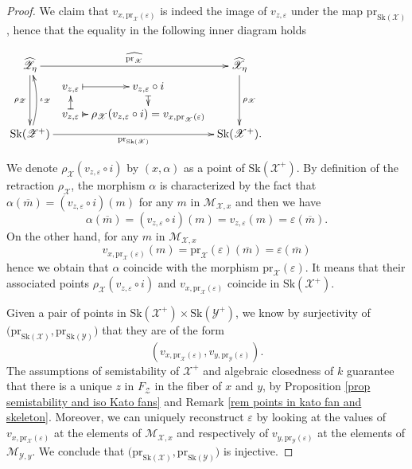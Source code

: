\documentclass{amsart}%
\numberwithin{equation}{subsection}
\theoremstyle{plain2}
\theoremstyle{definition2}
\theoremstyle{stepstyle}
\theoremstyle{point}
\theoremstyle{subpoint}
\newcommand{\cX}{\ensuremath{\mathscr{X}}}
\newcommand{\caM}{\ensuremath{\mathcal{M}}}
\newcommand{\cY}{\ensuremath{\mathscr{Y}}}
\newcommand{\cZ}{\ensuremath{\mathscr{Z}}}
\renewcommand{\cY}{\ensuremath{\mathscr{Y}}}
\newcommand{\pr}{\mathrm{pr}}
\newcommand{\Sk}{\mathrm{Sk}}
\begin{document}
\begin{proof}
We claim that $v_{x, \pr_{\cX}(\varepsilon)}$ is indeed the image of $v_{z,\varepsilon}$ under the map $\pr_{\Sk(\cX)}$, hence that the equality in the following inner diagram holds
\begin{center} 
$\begin{gathered}
\xymatrixcolsep{0.4pc}\xymatrixrowsep{0.1pc} \xymatrix{
 \widehat{\cZ_{\eta}} \ar[rrr]^-{\widehat{\pr_{\cX}}} \ar[dddd]_{\rho_\cZ} & & & \widehat{\cX_{\eta}}\ar[dddd]^{\rho_\cX}\\
 \footnotesize & v_{z,\varepsilon} \ar@{|->}[r] &  v_{z,\varepsilon} \circ i\ar@{|->}[dd] & \\
 & & & \\
 & v_{z,\varepsilon} \ar@{|->}[uu] \ar@{|->}[r] & \rho_\cX(v_{z,\varepsilon} \circ i) = v_{x, \pr_{\cX}(\varepsilon)}& \\
 \normalsize \Sk(\cZ^+) \ar[rrr]_-{\pr_{\Sk(\cX)}} \ar@/_/[uuuu]_-{\iota_\cZ}  & & & \Sk(\cX^+).
}
\end{gathered}$\end{center} We denote $\rho_\cX(v_{z,\varepsilon} \circ i)$ by $(x,\alpha)$ as a point of $\Sk(\cX^+)$. By definition of the retraction $\rho_\cX$, the morphism $\alpha$ is characterized by the fact that $\alpha(\overline{m})= (v_{z,\varepsilon} \circ i )(m)$ for any $m$ in $\caM_{\cX,x}$ and then we have $$\alpha(\overline{m})= (v_{z,\varepsilon} \circ i )(m) = v_{z,\varepsilon}(m)= \varepsilon(\overline{m}).$$ On the other hand, for any $m$ in $\caM_{\cX,x}$ $$v_{x,\pr_{\cX}(\varepsilon)}(m)= \pr_{\cX}(\varepsilon) (\overline{m}) = \varepsilon(\overline{m})$$ hence we obtain that $\alpha$ coincide with the morphism $\pr_{\cX}(\varepsilon)$. It means that their associated points $\rho_\cX(v_{z,\varepsilon} \circ i)$ and $v_{x, \pr_{\cX}(\varepsilon)}$ coincide in $\Sk(\cX^+)$.

Given a pair of points in $\Sk(\cX^+) \times \Sk(\cY^+)$, we know by surjectivity of $\big(\pr_{\Sk(\cX)}, \pr_{\Sk(\cY)}\big)$  that they are of the form $$(v_{x, \pr_{\cX}(\varepsilon)}, v_{y, \pr_{\cY}(\varepsilon)}).$$ The assumptions of semistability of $\cX^+$ and algebraic closedness of $k$ guarantee that there is a unique $z$ in $F_\cZ$ in the fiber of $x$ and $y$, by Proposition \ref{prop semistability and iso Kato fans} and Remark \ref{rem points in kato fan and skeleton}. Moreover, we can uniquely reconstruct $\varepsilon$ by looking at the values of $v_{x, \pr_{\cX}(\varepsilon)}$ at the elements of $\caM_{\cX,x}$ and respectively of $v_{y, \pr_{\cY}(\varepsilon)}$ at the elements of $\caM_{\cY,y}$. We conclude that $\big(\pr_{\Sk(\cX)}, \pr_{\Sk(\cY)}\big)$  is injective.
\end{proof}
\end{document}
